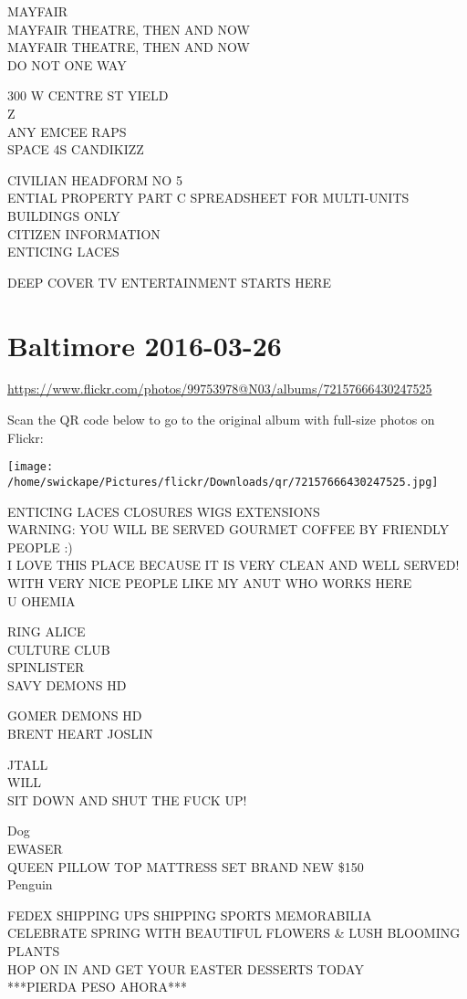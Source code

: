 \documentclass[10pt,letterpaper]{article}
\begin{document}
MAYFAIR\\
MAYFAIR THEATRE, THEN AND NOW\\
MAYFAIR THEATRE, THEN AND NOW\\
DO NOT ONE WAY

300 W CENTRE ST YIELD\\
Z\\
ANY EMCEE RAPS\\
SPACE 4S CANDIKIZZ

CIVILIAN HEADFORM NO 5\\
ENTIAL PROPERTY PART C SPREADSHEET FOR MULTI{-}UNITS BUILDINGS ONLY\\
CITIZEN INFORMATION\\
ENTICING LACES

DEEP COVER TV ENTERTAINMENT STARTS HERE


\section*{Baltimore 2016-03-26}

\url{https://www.flickr.com/photos/99753978@N03/albums/72157666430247525}

Scan the QR code below to go to the original album with full-size photos on Flickr:

\texttt{[image: /home/swickape/Pictures/flickr/Downloads/qr/72157666430247525.jpg]}


ENTICING LACES CLOSURES WIGS EXTENSIONS\\
WARNING: YOU WILL BE SERVED GOURMET COFFEE BY FRIENDLY PEOPLE :)\\
I LOVE THIS PLACE BECAUSE IT IS VERY CLEAN AND WELL SERVED!  WITH VERY NICE PEOPLE LIKE MY ANUT WHO WORKS HERE\\
U OHEMIA

RING ALICE\\
CULTURE CLUB\\
SPINLISTER\\
SAVY DEMONS HD

GOMER DEMONS HD\\
BRENT HEART JOSLIN

JTALL\\
WILL\\
SIT DOWN AND SHUT THE FUCK UP!

Dog\\
EWASER\\
QUEEN PILLOW TOP MATTRESS SET BRAND NEW \$150\\
Penguin

FEDEX SHIPPING UPS SHIPPING SPORTS MEMORABILIA\\
CELEBRATE SPRING WITH BEAUTIFUL FLOWERS \& LUSH BLOOMING PLANTS\\
HOP ON IN AND GET YOUR EASTER DESSERTS TODAY\\
***PIERDA PESO AHORA***
\end{document}
